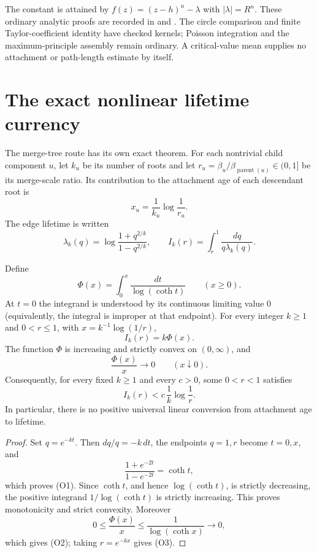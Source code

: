 \documentclass[11pt]{article}
\begin{document}
The constant is attained by $f(z)=(z-h)^n-\lambda$ with $|\lambda|=R^n$.
These ordinary analytic proofs are recorded in
 and
.
The circle comparison and finite Taylor-coefficient identity have checked
kernels; Poisson integration and the maximum-principle assembly remain ordinary.
A critical-value mean supplies no attachment or path-length estimate by itself.

\section{The exact nonlinear lifetime currency}
\label{sec:orlicz}

The merge-tree route has its own exact theorem.  For each nontrivial child
component $u$, let $k_u$ be its number of roots and let
$r_u=\beta_u/\beta_{\operatorname{parent}(u)}\in(0,1]$ be its merge-scale
ratio.  Its contribution to the attachment age of each descendant root is
\[
 x_u=\frac1{k_u}\log\frac1{r_u}.
\]
The edge lifetime is written
\[
 \lambda_k(q)=\log\frac{1+q^{2/k}}{1-q^{2/k}},
 \qquad
 I_k(r)=\int_r^1\frac{dq}{q\lambda_k(q)}.
\]

\begin{theorem}
\label{res:orlicz-currency}
Define
\[
 \Phi(x)=\int_0^x\frac{dt}{\log(\coth t)}\qquad(x\ge0).
\]
At $t=0$ the integrand is understood by its continuous limiting value $0$
(equivalently, the integral is improper at that endpoint).
For every integer $k\ge1$ and $0<r\le1$, with
$x=k^{-1}\log(1/r)$,
\[
 I_k(r)=k\Phi(x).                                      \tag{O1}
\]
The function $\Phi$ is increasing and strictly convex on $(0,\infty)$, and
\[
 \frac{\Phi(x)}x\longrightarrow0\qquad(x\downarrow0). \tag{O2}
\]
Consequently, for every fixed $k\ge1$ and every $c>0$, some $0<r<1$
satisfies
\[
 I_k(r)<c\,\frac1k\log\frac1r.                        \tag{O3}
\]
In particular, there is no positive universal linear conversion from
attachment age to lifetime.
\end{theorem}

\begin{proof}
Set $q=e^{-kt}$.  Then $dq/q=-k\,dt$, the endpoints $q=1,r$ become
$t=0,x$, and
\[
 \frac{1+e^{-2t}}{1-e^{-2t}}=\coth t,
\]
which proves (O1).  Since $\coth t$, and hence $\log(\coth t)$, is strictly
decreasing, the positive integrand $1/\log(\coth t)$ is strictly increasing.
This proves monotonicity and strict convexity.  Moreover
\[
 0\le\frac{\Phi(x)}x\le\frac1{\log(\coth x)}\longrightarrow0,
\]
which gives (O2); taking $r=e^{-kx}$ gives (O3).
\end{proof}
\end{document}
